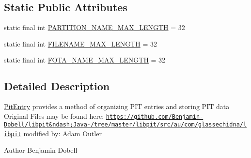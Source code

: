 \subsection*{Static Public Attributes}
\begin{DoxyCompactItemize}
\item 
static final int \hyperlink{class_c_a_s_u_a_l_1_1archiving_1_1libpit_1_1_pit_entry_af13f15acef20a1165f8a5dafd4f226c3}{P\-A\-R\-T\-I\-T\-I\-O\-N\-\_\-\-N\-A\-M\-E\-\_\-\-M\-A\-X\-\_\-\-L\-E\-N\-G\-T\-H} = 32
\item 
static final int \hyperlink{class_c_a_s_u_a_l_1_1archiving_1_1libpit_1_1_pit_entry_a46b5d992becfab0939001180f36d07d1}{F\-I\-L\-E\-N\-A\-M\-E\-\_\-\-M\-A\-X\-\_\-\-L\-E\-N\-G\-T\-H} = 32
\item 
static final int \hyperlink{class_c_a_s_u_a_l_1_1archiving_1_1libpit_1_1_pit_entry_a11e133f9298c905dee403577ffc1db21}{F\-O\-T\-A\-\_\-\-N\-A\-M\-E\-\_\-\-M\-A\-X\-\_\-\-L\-E\-N\-G\-T\-H} = 32
\end{DoxyCompactItemize}


\subsection{Detailed Description}
\hyperlink{class_c_a_s_u_a_l_1_1archiving_1_1libpit_1_1_pit_entry}{Pit\-Entry} provides a method of organizing P\-I\-T entries and storing P\-I\-T data Original Files may be found here\-: \href{https://github.com/Benjamin-Dobell/libpit&ndash;Java-/tree/master/libpit/src/au/com/glassechidna/libpit}{\tt https\-://github.\-com/\-Benjamin-\/\-Dobell/libpit\&ndash;\-Java-\//tree/master/libpit/src/au/com/glassechidna/libpit} modified by\-: Adam Outler

\begin{DoxyAuthor}{Author}
Benjamin Dobell 
\end{DoxyAuthor}


